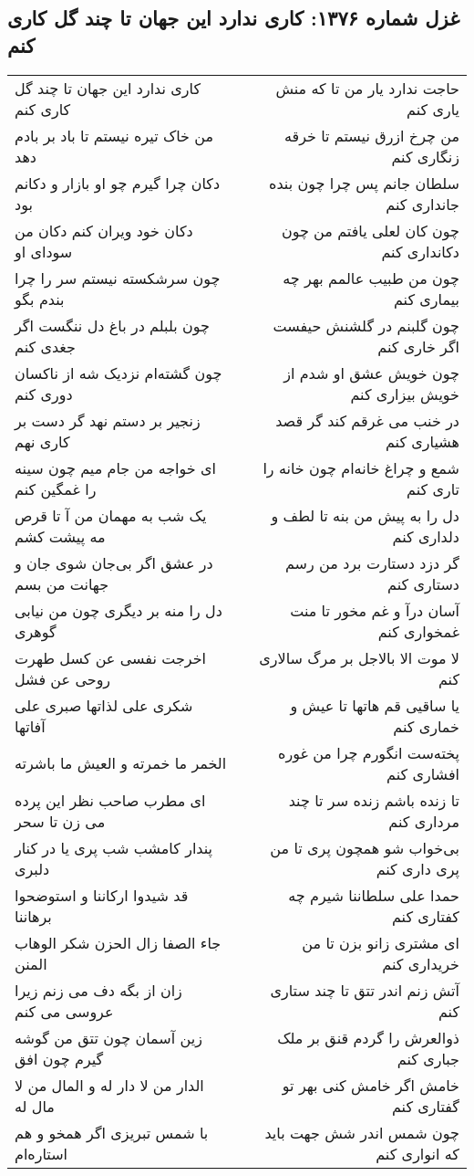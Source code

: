 \begin{center}
\section*{غزل شماره ۱۳۷۶: کاری ندارد این جهان تا چند گل کاری کنم}
\label{sec:1376}
\begin{longtable}{l p{0.5cm} r}
کاری ندارد این جهان تا چند گل کاری کنم
&&
حاجت ندارد یار من تا که منش یاری کنم
\\
من خاک تیره نیستم تا باد بر بادم دهد
&&
من چرخ ازرق نیستم تا خرقه زنگاری کنم
\\
دکان چرا گیرم چو او بازار و دکانم بود
&&
سلطان جانم پس چرا چون بنده جانداری کنم
\\
دکان خود ویران کنم دکان من سودای او
&&
چون کان لعلی یافتم من چون دکانداری کنم
\\
چون سرشکسته نیستم سر را چرا بندم بگو
&&
چون من طبیب عالمم بهر چه بیماری کنم
\\
چون بلبلم در باغ دل ننگست اگر جغدی کنم
&&
چون گلبنم در گلشنش حیفست اگر خاری کنم
\\
چون گشته‌ام نزدیک شه از ناکسان دوری کنم
&&
چون خویش عشق او شدم از خویش بیزاری کنم
\\
زنجیر بر دستم نهد گر دست بر کاری نهم
&&
در خنب می غرقم کند گر قصد هشیاری کنم
\\
ای خواجه من جام میم چون سینه را غمگین کنم
&&
شمع و چراغ خانه‌ام چون خانه را تاری کنم
\\
یک شب به مهمان من آ تا قرص مه پیشت کشم
&&
دل را به پیش من بنه تا لطف و دلداری کنم
\\
در عشق اگر بی‌جان شوی جان و جهانت من بسم
&&
گر دزد دستارت برد من رسم دستاری کنم
\\
دل را منه بر دیگری چون من نیابی گوهری
&&
آسان درآ و غم مخور تا منت غمخواری کنم
\\
اخرجت نفسی عن کسل طهرت روحی عن فشل
&&
لا موت الا بالاجل بر مرگ سالاری کنم
\\
شکری علی لذاتها صبری علی آفاتها
&&
یا ساقیی قم هاتها تا عیش و خماری کنم
\\
الخمر ما خمرته و العیش ما باشرته
&&
پخته‌ست انگورم چرا من غوره افشاری کنم
\\
ای مطرب صاحب نظر این پرده می زن تا سحر
&&
تا زنده باشم زنده سر تا چند مرداری کنم
\\
پندار کامشب شب پری یا در کنار دلبری
&&
بی‌خواب شو همچون پری تا من پری داری کنم
\\
قد شیدوا ارکاننا و استوضحوا برهاننا
&&
حمدا علی سلطاننا شیرم چه کفتاری کنم
\\
جاء الصفا زال الحزن شکر الوهاب المنن
&&
ای مشتری زانو بزن تا من خریداری کنم
\\
زان از بگه دف می زنم زیرا عروسی می کنم
&&
آتش زنم اندر تتق تا چند ستاری کنم
\\
زین آسمان چون تتق من گوشه گیرم چون افق
&&
ذوالعرش را گردم قنق بر ملک جباری کنم
\\
الدار من لا دار له و المال من لا مال له
&&
خامش اگر خامش کنی بهر تو گفتاری کنم
\\
با شمس تبریزی اگر همخو و هم استاره‌ام
&&
چون شمس اندر شش جهت باید که انواری کنم
\\
\end{longtable}
\end{center}
